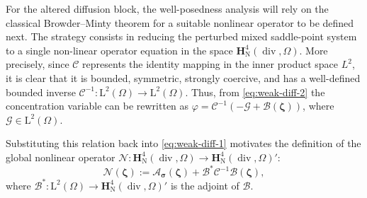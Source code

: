 \documentclass[fleqn,a4paper]{cas-sc}
\newcommand\vdiv{\mathop{\mathrm{div}}\nolimits}
\newcommand{\bzeta}{\boldsymbol{\zeta}}
\newcommand{\0}{\boldsymbol{0}}
\newcommand\cC{\mathcal{C}}
\newcommand\cG{\mathcal{G}}
\newcommand\cN{\mathcal{N}}
\newcommand\bH{\mathbf{H}}
\newcommand\rL{\mathrm{L}}
\newcommand\bsigma{\boldsymbol{\sigma}}
\numberwithin{equation}{section}
\numberwithin{figure}{section}
\begin{document}
For the altered diffusion block, the well-posedness analysis will rely on the classical Browder--Minty theorem for a suitable nonlinear operator to be defined next. The strategy consists in reducing the perturbed mixed saddle-point system to a single non-linear operator equation in the space $\bH^4_{\mathrm{N}}(\vdiv,\Omega)$. 
More precisely, since $\cC$ represents the identity mapping in the inner product space $L^2$, it is clear that it is bounded, symmetric, strongly coercive, and has a well-defined bounded inverse $\cC^{-1}: \rL^{2}(\Omega) \to \rL^{2}(\Omega)$. Thus, from  \eqref{eq:weak-diff-2} the concentration variable can be rewritten as $\varphi = \cC^{-1}(-\cG + \mathcal{B}(\bzeta))$, where $\cG \in \rL^{2}(\Omega)$.

Substituting this relation back into \eqref{eq:weak-diff-1} motivates the definition of the global nonlinear operator $\cN: \bH^4_{\mathrm{N}}(\vdiv,\Omega) \to \bH^4_{\mathrm{N}}(\vdiv,\Omega)'$:
\begin{equation*} %
    \cN(\bzeta) := \mathcal{A}_{{\bsigma}}(\bzeta) + \mathcal{B}^* \cC^{-1} \mathcal{B}(\bzeta),
\end{equation*}
where $\mathcal{B}^*: \rL^{2}(\Omega) \to \bH^4_{\mathrm{N}}(\vdiv,\Omega)'$ is the adjoint of $\mathcal{B}$.
\end{document}
